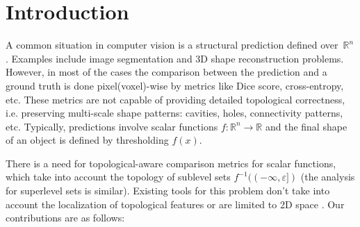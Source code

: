 \documentclass[runningheads]{llncs}
\begin{document}
\section{Introduction}


A common situation in computer vision is a structural prediction defined over~$\mathbb{R}^n$. Examples include image segmentation \cite{ronneberger2015u, hu2019topology, hu2021topology, stucki2023topologically} and 3D shape reconstruction 
\cite{wu2017marrnet, waibel2022capturing, waibel2022shapr} problems. 
However, in most of the cases the comparison between the prediction and a ground truth is done pixel(voxel)-wise by metrics like Dice score, cross-entropy, etc. 
These metrics are not capable of providing detailed topological correctness, i.e. preserving multi-scale shape patterns: cavities, holes, connectivity patterns, etc. 
Typically, predictions involve scalar functions \mbox{$f: \mathbb{R}^n \to \mathbb{R}$} and the final shape of an object is defined by thresholding $f(x)$.%

There is a need for topological-aware comparison metrics for scalar functions, which take into account the topology of sublevel sets $f^{-1}((-\infty, \varepsilon])$ (the analysis for superlevel sets is similar). 
Existing tools for this problem don't take into account the localization of topological features \cite{hu2019topology, waibel2022capturing} or are limited to 2D space \cite{stucki2023topologically}. 
Our contributions are as follows:
\end{document}
